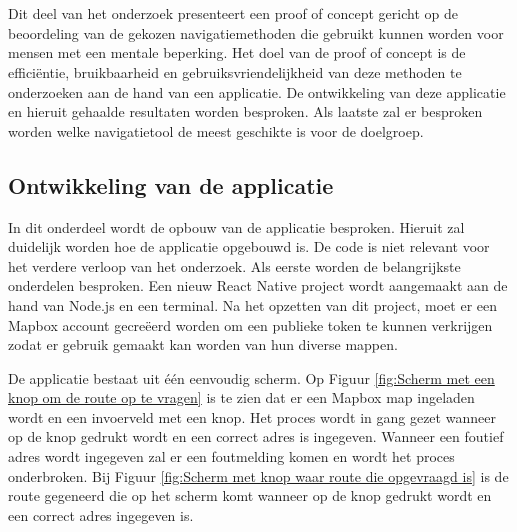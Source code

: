
\chapter{}%
\label{ch:proof-of-concept}

Dit deel van het onderzoek presenteert een proof of concept gericht op de beoordeling van de gekozen navigatiemethoden die gebruikt kunnen worden voor mensen met een mentale beperking. Het doel van de proof of concept is de efficiëntie, bruikbaarheid en gebruiksvriendelijkheid van deze methoden te onderzoeken aan de hand van een applicatie. De ontwikkeling van deze applicatie en hieruit gehaalde resultaten worden besproken. Als laatste zal er besproken worden welke navigatietool de meest geschikte is voor de doelgroep.

\section{Ontwikkeling van de applicatie}
\label{sec:ontwikkeling van de applicatie}
In dit onderdeel wordt de opbouw van de applicatie besproken. Hieruit zal duidelijk worden hoe de applicatie opgebouwd is. De code is niet relevant voor het verdere verloop van het onderzoek. Als eerste worden de belangrijkste onderdelen besproken. Een nieuw React Native project wordt aangemaakt aan de hand van Node.js en een terminal. Na het opzetten van dit project, moet er een Mapbox account gecreëerd worden om een publieke token te kunnen verkrijgen zodat er gebruik gemaakt kan worden van hun diverse mappen. \newline

De applicatie bestaat uit één eenvoudig scherm. Op Figuur \ref{fig:Scherm met een knop om de route op te vragen} is te zien dat er een Mapbox map ingeladen wordt en een invoerveld met een knop. Het proces wordt in gang gezet wanneer op de knop gedrukt wordt en een correct adres is ingegeven. Wanneer een foutief adres wordt ingegeven zal er een foutmelding komen en wordt het proces onderbroken. Bij Figuur \ref{fig:Scherm met knop waar route die opgevraagd is} is de route gegeneerd die op het scherm komt wanneer op de knop gedrukt wordt en een correct adres ingegeven is.

